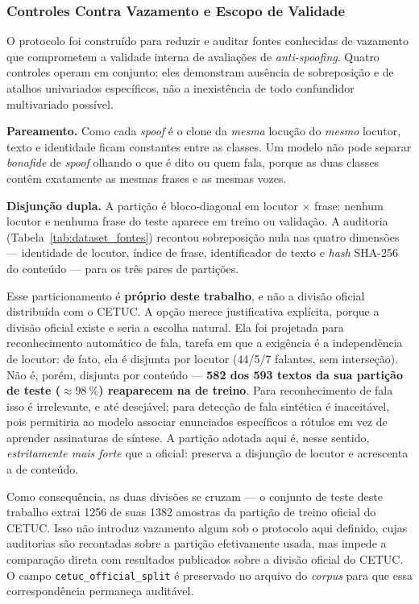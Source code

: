 \documentclass[12pt,a4paper]{article}
\begin{document}
\subsubsection{Controles Contra Vazamento e Escopo de Validade}
\label{sec:vazamento}

O protocolo foi construído para reduzir e auditar fontes conhecidas de
vazamento que comprometem a validade interna de avaliações de
\textit{anti-spoofing}. Quatro controles operam em conjunto; eles demonstram
ausência de sobreposição e de atalhos univariados específicos, não a inexistência
de todo confundidor multivariado possível.

\textbf{Pareamento.} Como cada \textit{spoof} é o clone da \textit{mesma}
locução do \textit{mesmo} locutor, texto e identidade ficam constantes entre as
classes. Um modelo não pode separar \textit{bonafide} de \textit{spoof} olhando
o que é dito ou quem fala, porque as duas classes contêm exatamente as mesmas
frases e as mesmas vozes.

\textbf{Disjunção dupla.} A partição é bloco-diagonal em locutor $\times$
frase: nenhum locutor e nenhuma frase do teste aparece em treino ou validação.
A auditoria (Tabela~\ref{tab:dataset_fontes}) recontou sobreposição nula nas
quatro dimensões --- identidade de locutor, índice de frase, identificador de
texto e \textit{hash} SHA-256 do conteúdo --- para os três pares de partições.

Esse particionamento é \textbf{próprio deste trabalho}, e não a divisão oficial
distribuída com o CETUC. A opção merece justificativa explícita, porque a
divisão oficial existe e seria a escolha natural. Ela foi projetada para
reconhecimento automático de fala, tarefa em que a exigência é a independência
de locutor: de fato, ela é disjunta por locutor (\num{44}/\num{5}/\num{7}
falantes, sem interseção). Não é, porém, disjunta por conteúdo ---
\textbf{\num{582} dos \num{593} textos da sua partição de teste
	($\approx\SI{98}{\percent}$) reaparecem na de treino}. Para reconhecimento de
fala isso é irrelevante, e até desejável; para detecção de fala sintética é
inaceitável, pois permitiria ao modelo associar enunciados específicos a
rótulos em vez de aprender assinaturas de síntese. A partição adotada aqui é,
nesse sentido, \emph{estritamente mais forte} que a oficial: preserva a
disjunção de locutor e acrescenta a de conteúdo.

Como consequência, as duas divisões se cruzam --- o conjunto de teste deste
trabalho extrai \num{1256} de suas \num{1382} amostras da partição de treino
oficial do CETUC. Isso não introduz vazamento algum sob o protocolo aqui
definido, cujas auditorias são recontadas sobre a partição efetivamente usada,
mas impede a comparação direta com resultados publicados sobre a divisão
oficial do CETUC. O campo \texttt{cetuc\_official\_split} é preservado no
arquivo do \textit{corpus} para que essa correspondência permaneça auditável.
\end{document}
